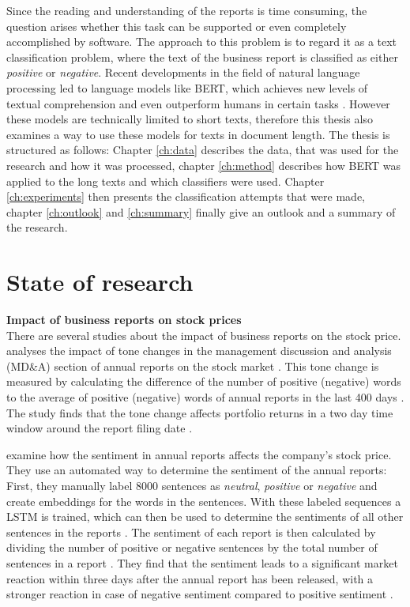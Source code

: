 Since the reading and understanding of the reports is time consuming, the question arises whether this task can be supported or even completely accomplished by software.
The approach to this problem is to regard it as a text classification problem, where the text of the business report is classified as either \textit{positive} or \textit{negative}.
Recent developments in the field of natural language processing led to language models like \acs{BERT}, which achieves new levels of textual comprehension and even outperform humans in certain tasks \cite[p. 7]{Devlin2018}.
However these models are technically limited to short texts, therefore this thesis also examines a way to use these models for texts in document length.
The thesis is structured as follows:
Chapter \ref{ch:data} describes the data, that was used for the research and how it was processed, chapter \ref{ch:method} describes how \acs{BERT} was applied to the long texts and which classifiers were used.
Chapter \ref{ch:experiments} then presents the classification attempts that were made, chapter \ref{ch:outlook} and \ref{ch:summary} finally give an outlook and a summary of the research.
\section{State of research}
\textbf{Impact of business reports on stock prices} \\
There are several studies about the impact of business reports on the stock price.
\cite{Feldman2010} analyses the impact of tone changes in the management discussion and analysis (MD\&A) section of annual reports on the stock market \cite[p. 918]{Feldman2010}.
This tone change is measured by calculating the difference of the number of positive (negative) words to the average of positive (negative) words of annual reports in the last 400 days \cite[p. 927]{Feldman2010}.
The study finds that the tone change affects portfolio returns in a two day time window around the report filing date \cite[pp. 935-936]{Feldman2010}.

\cite{Azimi2019} examine how the sentiment in annual reports affects the company's stock price.
They use an automated way to determine the sentiment of the annual reports:
First, they manually label 8000 sentences as \textit{neutral}, \textit{positive} or \textit{negative} and create embeddings for the words in the sentences.
With these labeled sequences a \ac{LSTM} is trained, which can then be used to determine the sentiments of all other sentences in the reports \cite[p. 12]{Azimi2019}.
The sentiment of each report is then calculated by dividing the number of positive or negative sentences by the total number of sentences in a report \cite[p. 15]{Azimi2019}.
They find that the sentiment leads to a significant market reaction within three days after the annual report has been released, with a stronger reaction in case of negative sentiment compared to positive sentiment \cite[pp. 17-18]{Azimi2019}.

